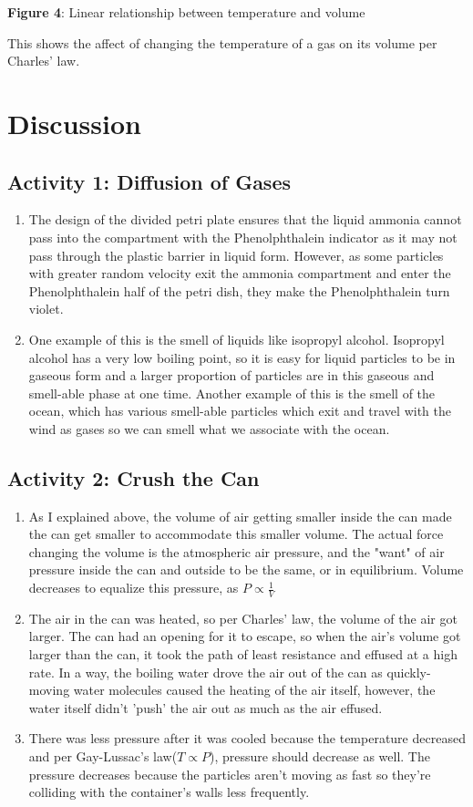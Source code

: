 \documentclass{article}
\begin{document}
\textbf{Figure 4}: Linear relationship between temperature and volume

This shows the affect of changing the temperature of a gas on its volume per Charles' law.
\section{Discussion}
\subsection{Activity 1: Diffusion of Gases}
\begin{enumerate}
        \item The design of the divided petri plate ensures that the liquid ammonia cannot pass into the compartment with the Phenolphthalein indicator as it may not pass through the plastic barrier in liquid form.  However, as some particles with greater random velocity exit the ammonia compartment and enter the Phenolphthalein half of the petri dish, they make the Phenolphthalein turn violet.
        \item One example of this is the smell of liquids like isopropyl alcohol.  Isopropyl alcohol has a very low boiling point, so it is easy for liquid particles to be in gaseous form and a larger proportion of particles are in this gaseous and smell-able phase at one time.  Another example of this is the smell of the ocean, which has various smell-able particles which exit and travel with the wind as gases so we can smell what we associate with the ocean.
    \end{enumerate}
\subsection{Activity 2: Crush the Can}\rho 
    \begin{enumerate}
        \item As I explained above, the volume of air getting smaller inside the can made the can get smaller to accommodate this smaller volume. The actual force changing the volume is the atmospheric air pressure, and the "want" of air pressure inside the can and outside to be the same, or in equilibrium. Volume decreases to equalize this pressure, as $P\propto \frac{1}{V}$
        \item The air in the can was heated, so per Charles' law, the volume of the air got larger.  The can had an opening for it to escape, so when the air's volume got larger than the can, it took the path of least resistance and effused at a high rate. In a way, the boiling water drove the air out of the can as quickly-moving water molecules caused the heating of the air itself, however, the water itself didn't 'push' the air out as much as the air effused.
        \item There was less pressure after it was cooled because the temperature decreased and per Gay-Lussac's law($T\propto P$), pressure should decrease as well. The pressure decreases because the particles aren't moving as fast so they're colliding with the container's walls less frequently. 
    \end{enumerate}
\end{document}
